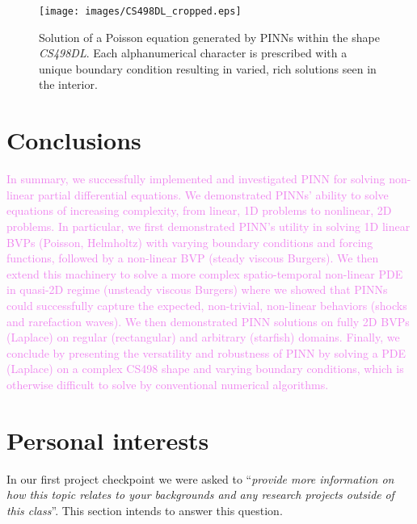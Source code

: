 \documentclass[11pt]{article}
\newcommand{\newcontent}[1]{\textcolor{violet}{#1}}
\begin{document}
\begin{figure}[htbp]
\centering
\texttt{[image: images/CS498DL\_cropped.eps]}
\caption{\label{fig:cs498_poisson_results}Solution of a Poisson equation generated by PINNs within the shape \emph{CS498DL}. Each alphanumerical character is prescribed with a unique boundary condition resulting in varied, rich solutions seen in the interior.}
\end{figure}

\section{Conclusions}
\label{sec:org9701e2b}
\newcontent{
In summary, we successfully implemented and investigated PINN for solving
non-linear partial differential equations. We demonstrated PINNs’ ability to
solve equations of increasing complexity, from linear, 1D problems to
nonlinear, 2D problems. In particular, we first demonstrated PINN's utility in
solving 1D linear BVPs (Poisson, Helmholtz) with varying boundary conditions
and forcing functions, followed by a non-linear BVP (steady viscous Burgers).
We then extend this machinery to solve a more complex spatio-temporal
non-linear PDE in quasi-2D regime (unsteady viscous Burgers) where we showed
that PINNs could successfully capture the expected, non-trivial, non-linear
behaviors (shocks and rarefaction waves). We then demonstrated PINN solutions
on fully 2D BVPs (Laplace) on regular (rectangular) and arbitrary (starfish)
domains. Finally, we conclude
by presenting the versatility and robustness of PINN by solving a PDE
(Laplace) on a complex CS498 shape and varying boundary conditions, which is
otherwise difficult to solve by conventional numerical algorithms.
}
\section{Personal interests}
\label{sec:orgad03acb}
In our first project checkpoint we were asked to ``\emph{provide more information on}
\emph{how this topic relates to your backgrounds and any research projects outside}
\emph{of this class}''. This section intends to answer this question.
\end{document}
